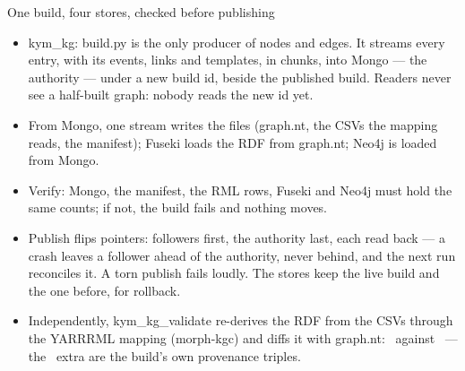 \begin{frame}{One build, four stores, checked before publishing}
{\begin{itemize}
    \item kym\_kg: build.py is the only producer of nodes and edges. It streams every entry, with
      its events, links and templates, in chunks, into Mongo --- the authority --- under a new build
      id, beside the published build. Readers never see a half-built graph: nobody reads the new
      id yet.
    \item From Mongo, one stream writes the files (graph.nt, the CSVs the mapping reads, the
      manifest); Fuseki loads the RDF from graph.nt; Neo4j is loaded from Mongo.
    \item Verify: Mongo, the manifest, the RML rows, Fuseki and Neo4j must hold the same counts;
      if not, the build fails and nothing moves.
    \item Publish flips pointers: followers first, the authority last, each read back --- a crash
      leaves a follower ahead of the authority, never behind, and the next run reconciles it. A
      torn publish fails loudly. The stores keep the live build and the one before, for rollback.
    \item Independently, kym\_kg\_validate re-derives the RDF from the CSVs through the YARRRML
      mapping (morph-kgc) and diffs it with graph.nt: \NRmlTriples\ against \NTriples\ --- the
      \NTriplesDiff\ extra are the build's own provenance triples.
  \end{itemize}}
\end{frame}
